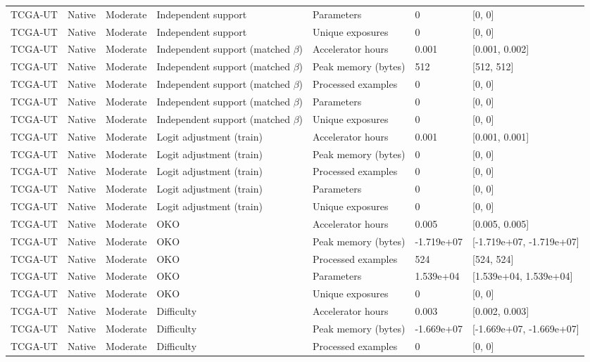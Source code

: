 \begin{longtable}{lllllll}
TCGA-UT & Native & Moderate & Independent support & Parameters & 0 & [0, 0] \\
TCGA-UT & Native & Moderate & Independent support & Unique exposures & 0 & [0, 0] \\
TCGA-UT & Native & Moderate & Independent support (matched $\beta$) & Accelerator hours & 0.001 & [0.001, 0.002] \\
TCGA-UT & Native & Moderate & Independent support (matched $\beta$) & Peak memory (bytes) & 512 & [512, 512] \\
TCGA-UT & Native & Moderate & Independent support (matched $\beta$) & Processed examples & 0 & [0, 0] \\
TCGA-UT & Native & Moderate & Independent support (matched $\beta$) & Parameters & 0 & [0, 0] \\
TCGA-UT & Native & Moderate & Independent support (matched $\beta$) & Unique exposures & 0 & [0, 0] \\
TCGA-UT & Native & Moderate & Logit adjustment (train) & Accelerator hours & 0.001 & [0.001, 0.001] \\
TCGA-UT & Native & Moderate & Logit adjustment (train) & Peak memory (bytes) & 0 & [0, 0] \\
TCGA-UT & Native & Moderate & Logit adjustment (train) & Processed examples & 0 & [0, 0] \\
TCGA-UT & Native & Moderate & Logit adjustment (train) & Parameters & 0 & [0, 0] \\
TCGA-UT & Native & Moderate & Logit adjustment (train) & Unique exposures & 0 & [0, 0] \\
TCGA-UT & Native & Moderate & OKO & Accelerator hours & 0.005 & [0.005, 0.005] \\
TCGA-UT & Native & Moderate & OKO & Peak memory (bytes) & -1.719e+07 & [-1.719e+07, -1.719e+07] \\
TCGA-UT & Native & Moderate & OKO & Processed examples & 524 & [524, 524] \\
TCGA-UT & Native & Moderate & OKO & Parameters & 1.539e+04 & [1.539e+04, 1.539e+04] \\
TCGA-UT & Native & Moderate & OKO & Unique exposures & 0 & [0, 0] \\
TCGA-UT & Native & Moderate & Difficulty & Accelerator hours & 0.003 & [0.002, 0.003] \\
TCGA-UT & Native & Moderate & Difficulty & Peak memory (bytes) & -1.669e+07 & [-1.669e+07, -1.669e+07] \\
TCGA-UT & Native & Moderate & Difficulty & Processed examples & 0 & [0, 0] \\

\end{longtable}
